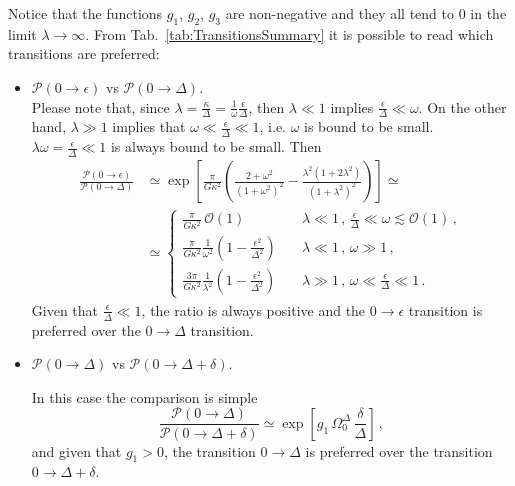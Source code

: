 \documentclass[11pt,a4paper]{article}
\begin{document}
\noindent Notice that the functions $g_1$, $g_2$, $g_3$ are non-negative and they all tend to $0$ in the limit $\lambda \rightarrow \infty$. From Tab.~\ref{tab:TransitionsSummary} it is possible to read which transitions are preferred:
\begin{itemize}
\item $\mathcal{P}(0 \rightarrow \epsilon)$ vs $\mathcal{P}(0 \rightarrow \Delta)$.\\
Please note that, since $\lambda = \frac{\kappa}{\Delta} = \frac{1}{\omega} \frac{\epsilon}{\Delta}$, then $\lambda \ll 1$ implies $\frac{\epsilon}{\Delta} \ll \omega$. On the other hand, $\lambda \gg 1$ implies that $\omega \ll \frac{\epsilon}{\Delta} \ll 1$, i.e. $\omega$ is bound to be small. $\lambda \omega = \frac{\epsilon}{\Delta} \ll 1$ is always bound to be small. Then
\begin{align}
\label{eq:0epsilonvs0Delta}
\frac{\mathcal{P}\left(0 \rightarrow \epsilon\right)}{\mathcal{P}\left(0 \rightarrow \Delta\right)} &\simeq \exp\left[\frac{\pi}{G \kappa^2} \left(\frac{2 + \omega^2}{\left(1 + \omega^2\right)^2} - \frac{\lambda^2 (1 + 2 \lambda^2)}{(1 + \lambda^2)^2}\right)\right] \simeq \nonumber \\
&\simeq \begin{cases}
\frac{\pi}{G \kappa^2} \,\mathcal{O}(1) \quad &\lambda \ll 1 \,, \, \frac{\epsilon}{\Delta} \ll \omega \lesssim \mathcal{O}(1) \,, \\
\frac{\pi}{G \kappa^2} \frac{1}{\omega^2} \left(1 - \frac{\epsilon^2}{\Delta^2} \right) \quad &\lambda \ll 1 \,, \, \omega \gg 1 \,, \\
\frac{3 \pi}{G \kappa^2} \frac{1}{\lambda^2}  \left(1 - \frac{\epsilon^2}{\Delta^2} \right) \quad &\lambda \gg 1 \,, \, \omega \ll \frac{\epsilon}{\Delta} \ll 1 \,.
\end{cases}
\end{align}
Given that $\frac{\epsilon}{\Delta} \ll 1$, the ratio is always positive and the $0 \rightarrow \epsilon$ transition is preferred over the $0 \rightarrow \Delta$ transition.

\item $\mathcal{P}(0 \rightarrow \Delta)$ vs $\mathcal{P}(0 \rightarrow \Delta + \delta)$.

In this case the comparison is simple
\begin{equation}
\label{eq:0Deltavs0Deltadelta}
\frac{\mathcal{P}\left(0 \rightarrow \Delta\right)}{\mathcal{P}\left(0 \rightarrow \Delta + \delta\right)} \simeq \exp\left[g_1 \, \Omega_0^\Delta \, \frac{\delta}{\Delta} \right] \,,
\end{equation}
and given that $g_1 > 0$, the transition $0 \rightarrow \Delta$ is preferred over the transition $0 \rightarrow \Delta + \delta$.


\end{itemize}
\end{document}
